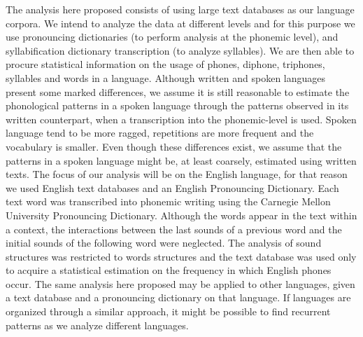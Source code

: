 The analysis here proposed consists of using large text databases 
as our language corpora. We intend to analyze the data at different levels
and for this purpose we use pronouncing dictionaries (to perform analysis at the phonemic level),
and syllabification dictionary transcription (to analyze syllables).
We are then able to procure statistical information on the usage of phones,
diphone, triphones, syllables and words in a language.
Although written and spoken languages present some marked differences, we assume 
it is still reasonable
to estimate the phonological patterns in a spoken language through  %
the patterns observed in its written counterpart, when a transcription into the phonemic-level is used.
Spoken language tend to be more ragged, repetitions are more frequent and the vocabulary
is smaller. Even though these differences exist,
we assume that the patterns in a spoken language might be, at least coarsely, estimated using written texts.
The focus of our analysis will be on the English language, for that reason we used English text databases
and an English Pronouncing Dictionary. Each text word was transcribed into phonemic 
writing using the Carnegie Mellon University Pronouncing Dictionary. 
Although the words appear in the text within a context, the interactions between the last sounds of a previous word 
and the initial sounds of the following word were neglected.
The analysis of sound structures was restricted to words structures and the text database was used only 
to acquire a statistical estimation on the frequency in which English phones occur.  
The same analysis here proposed may be applied to other languages, 
given a text database and a pronouncing dictionary on that language.
If languages are organized through a similar approach, it might be possible to find recurrent patterns 
as we analyze different languages. 


